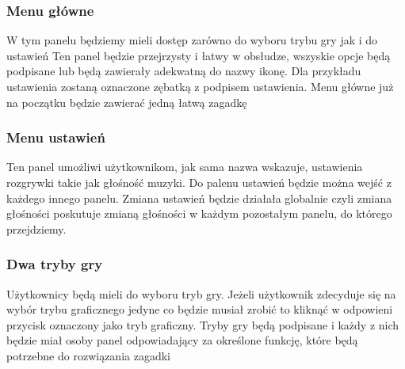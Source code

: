 \subsubsection{Menu główne}
\hspace*{0.60cm}W tym panelu będziemy mieli dostęp zarówno do wyboru trybu gry jak i do ustawień
Ten panel będzie przejrzysty i łatwy w obsłudze, wszyskie opcje będą podpisane lub będą zawierały adekwatną do nazwy ikonę. Dla przykładu ustawienia zostaną oznaczone zębatką z podpisem ustawienia. Menu główne już na początku będzie zawierać jedną łatwą zagadkę

\subsubsection{Menu ustawień}
\hspace*{0.60cm}Ten panel umożliwi użytkownikom, jak sama nazwa wskazuje, ustawienia rozgrywki takie jak głośność muzyki. Do palenu ustawień będzie można wejść z każdego innego panelu. Zmiana ustawień będzie działała globalnie czyli zmiana głośności poskutuje zmianą głośności w każdym pozostałym panelu, do którego przejdziemy.

\subsubsection{Dwa tryby gry}
\hspace*{0.60cm}Użytkownicy będą mieli do wyboru tryb gry. Jeżeli użytkownik zdecyduje się na wybór trybu graficznego jedyne co będzie musiał zrobić to kliknąć w odpowieni przycisk oznaczony jako tryb graficzny. Tryby gry będą podpisane i każdy z nich będzie miał osoby panel odpowiadający za określone funkcję, które będą potrzebne do rozwiązania zagadki